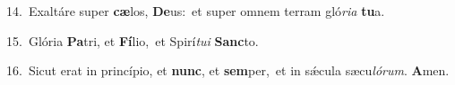 {\numbfont\textcolor{\numbcolor}{14.}}~Exaltáre super \textbf{cæ}\-los, \textbf{De}\-us:~\star et super omnem terram gló\-\textit{ri}\-\textit{a} \textbf{tu}\-a.\par
{\numbfont\textcolor{\numbcolor}{15.}}~Glória \textbf{Pa}\-tri, et \textbf{Fí}\-lio,~\star et Spirí\-\textit{tu}\-\textit{i} \textbf{Sanc}\-to.\par
{\numbfont\textcolor{\numbcolor}{16.}}~Sicut erat in princípio, et \textbf{nunc}\-, et \textbf{sem}\-per,~\star et in sǽcula sæcu\-\textit{ló}\-\textit{rum}. \textbf{A}\-men.\par
